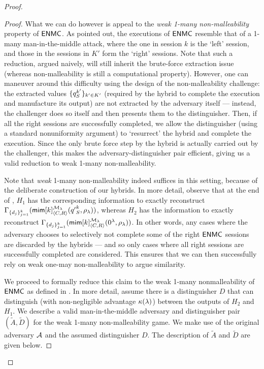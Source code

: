 \begin{proof}
\begin{proof}
        What we can do however is appeal to the {\em weak 1-many non-malleability} property of $\mathsf{ENMC}$. As pointed out, the executions of $\mathsf{ENMC}$ resemble that of a 1-many man-in-the-middle attack, where the one in session $k$ is the `left' session, and those in the sessions in $K'$ form the `right' sessions. Note that such a reduction, argued naively, will still inherit the brute-force extraction issue (whereas non-malleability is still a computational property). However, one can maneuver around this difficulty using the design of the non-malleability challenge: the extracted values $\{q_S^{k'}\}_{k' \in K'}$ (required by the hybrid to complete the execution and manufacture its output) are not extracted by the adversary itself --- instead, the challenger does so itself and then presents them to the distinguisher. Then, if all the right sessions are successfully completed, we allow the distinguisher (using a standard nonuniformity argument) to `resurrect' the hybrid and complete the execution. Since the only brute force step by the hybrid is actually carried out by the challenger, this makes the adversary-distinguisher pair efficient, giving us a valid reduction to weak 1-many non-malleability.      

        Note that {\em weak} 1-many non-malleability indeed suffices in this setting, because of the deliberate construction of our hybrids. In more detail, observe that at the end of , $H_1$ has the corresponding information to exactly reconstruct $\Gamma_{\{d_j\}_{j=1}^{k}}(\mathsf{mim}[k]^{\mathcal{M}_\lambda}_{\langle C, R \rangle}({q'}_S^k, \rho_\lambda))$, whereas $H_2$ has the information to exactly reconstruct $\Gamma_{\{d_j\}_{j=1}^{k}}(\mathsf{mim}[k]^{\mathcal{M}_\lambda}_{\langle C, R \rangle}(0^\lambda, \rho_\lambda))$. In other words, any cases where the adversary chooses to selectively not complete some of the right $\mathsf{ENMC}$ sessions are discarded by the hybrids --- and so only cases where all right sessions are successfully completed are considered. This ensures that we can then successfully rely on weak one-may non-malleability to argue similarity.    
        
        We proceed to formally reduce this claim to the weak 1-many nonmalleability of $\mathsf{ENMC}$ as defined in . In more detail,  assume there is a distinguisher $D$ that can distinguish (with non-negligible advantage $\kappa(\lambda)$) between the outputs of $H_2$ and $H_1$. 
        We describe a valid man-in-the-middle adversary and distinguisher pair $(\tilde{A},\tilde{D})$ for the weak 1-many non-malleability game. We make use of the original adversary $\mathcal{A}$ and the assumed distinguisher $D$. The description of $\tilde{A}$ and $\tilde{D}$ are given below. 


\end{proof}
\end{proof}
